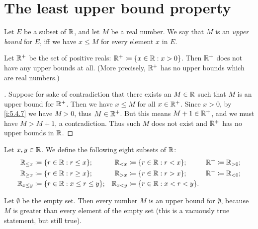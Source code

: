 \section{The least upper bound property}\label{i:sec:5.5}

\begin{defn}\label{i:5.5.1}
  Let \(E\) be a subset of \(\mathbb{R}\), and let \(M\) be a real number.
  We say that \(M\) is an \emph{upper bound} for \(E\), iff we have \(x \leq M\) for every element \(x\) in \(E\).
\end{defn}

\setcounter{thm}{2}
\begin{eg}\label{i:5.5.3}
  Let \(\mathbb{R}^+\) be the set of positive reals: \(\mathbb{R}^+ \coloneqq \left\lbrace x \in \mathbb{R} : x > 0\right\rbrace\).
  Then \(\mathbb{R}^+\) does not have any upper bounds at all.
  (More precisely, \(\mathbb{R}^+\) has no upper bounds which are real numbers.)
\end{eg}

\begin{proof}[]
  Suppose for sake of contradiction that there exists an \(M \in \mathbb{R}\) such that \(M\) is an upper bound for \(\mathbb{R}^+\).
  Then we have \(x \leq M\) for all \(x \in \mathbb{R}^+\).
  Since \(x > 0\), by \cref{i:5.4.7} we have \(M > 0\), thus \(M \in \mathbb{R}^+\).
  But this means \(M + 1 \in \mathbb{R}^+\), and we must have \(M > M + 1\), a contradiction.
  Thus such \(M\) does not exist and \(\mathbb{R}^+\) has no upper bounds in \(\mathbb{R}\).
\end{proof}

\begin{ac}\label{i:ac:5.5.1}
  Let \(x, y \in \mathbb{R}\).
  We define the following eight subsets of \(\mathbb{R}\):
  \begin{align*}
    \R_{\leq x}   & \coloneqq \set{r \in \R : r \leq x};        & \R_{< x}   & \coloneqq \set{r \in \R : r < x};     & \R^+ & \coloneqq \R_{> 0}; \\
    \R_{\geq x}   & \coloneqq \set{r \in \R : r \geq x};        & \R_{> x}   & \coloneqq \set{r \in \R : r > x};     & \R^- & \coloneqq \R_{< 0}; \\
    \R_{x \leq y} & \coloneqq \set{r \in \R : x \leq r \leq y}; & \R_{x < y} & \coloneqq \set{r \in \R : x < r < y}. &      &
  \end{align*}
\end{ac}

\begin{eg}\label{i:5.5.4}
  Let \(\emptyset\) be the empty set.
  Then every number \(M\) is an upper bound for \(\emptyset\), because \(M\) is greater than every element of the empty set
  (this is a vacuously true statement, but still true).
\end{eg}

